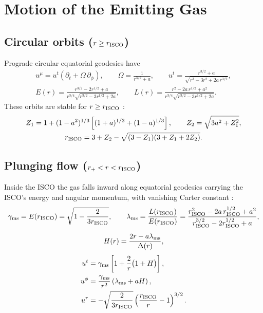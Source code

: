 \documentclass[11pt]{article}
\begin{document}
\section{Motion of the Emitting Gas}

\subsection{\texorpdfstring{Circular orbits ($r \ge r_{\rm ISCO}$)}{Circular orbits (r >= r\_ISCO)}}

Prograde circular equatorial geodesics have
\begin{gather}
u^\mu = u^t\left(\partial_t + \Omega\,\partial_\phi\right), \qquad
\Omega = \frac{1}{r^{3/2} + a}, \qquad
u^t = \frac{r^{3/2} + a}{\sqrt{r^3 - 3r^2 + 2a\,r^{3/2}}}, \\[1ex]
E(r) = \frac{r^{3/2} - 2r^{1/2} + a}{r^{3/4}\sqrt{r^{3/2} - 3r^{1/2} + 2a}}, \qquad
L(r) = \frac{r^2 - 2a\,r^{1/2} + a^2}{r^{3/4}\sqrt{r^{3/2} - 3r^{1/2} + 2a}}.
\end{gather}
These orbits are stable for $r \ge r_{\rm ISCO}$ \cite{Bardeen1972}:
\begin{gather}
Z_1 = 1 + (1-a^2)^{1/3}\left[(1+a)^{1/3} + (1-a)^{1/3}\right], \qquad
Z_2 = \sqrt{3a^2 + Z_1^2}, \\
r_{\rm ISCO} = 3 + Z_2 - \sqrt{(3 - Z_1)(3 + Z_1 + 2Z_2)}.
\end{gather}

\subsection{\texorpdfstring{Plunging flow ($r_+ < r < r_{\rm ISCO}$)}{Plunging flow (r\_+ < r < r\_ISCO)}}

Inside the ISCO the gas falls inward along equatorial geodesics carrying the
ISCO's energy and angular momentum, with vanishing Carter constant
\cite{Cunningham1975}:
\begin{gather}
\gamma_{\rm ms} = E(r_{\rm ISCO}) = \sqrt{1 - \frac{2}{3r_{\rm ISCO}}}, \qquad
\lambda_{\rm ms} = \frac{L(r_{\rm ISCO})}{E(r_{\rm ISCO})}
= \frac{r_{\rm ISCO}^2 - 2a\,r_{\rm ISCO}^{1/2} + a^2}{r_{\rm ISCO}^{3/2} - 2r_{\rm ISCO}^{1/2} + a}, \\[1ex]
H(r) = \frac{2r - a\lambda_{\rm ms}}{\Delta(r)},
\end{gather}
\begin{align}
u^t &= \gamma_{\rm ms}\left[1 + \frac{2}{r}\bigl(1 + H\bigr)\right], \\
u^\phi &= \frac{\gamma_{\rm ms}}{r^2}\left(\lambda_{\rm ms} + aH\right), \\
u^r &= -\sqrt{\frac{2}{3r_{\rm ISCO}}}\left(\frac{r_{\rm ISCO}}{r} - 1\right)^{3/2}.
\end{align}
\end{document}
